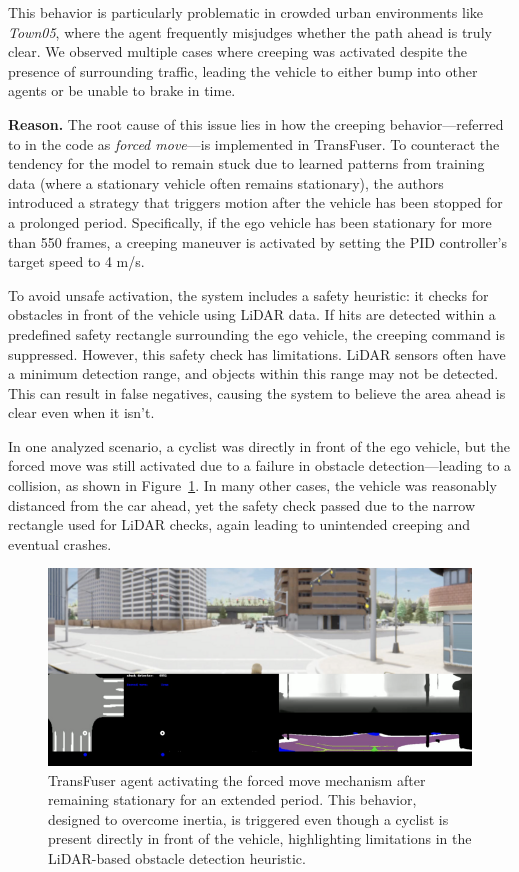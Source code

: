 This behavior is particularly problematic in crowded urban environments like \textit{Town05}, where the agent frequently misjudges whether the path ahead is truly clear. We observed multiple cases where creeping was activated despite the presence of surrounding traffic, leading the vehicle to either bump into other agents or be unable to brake in time.

\noindent\textbf{Reason.} The root cause of this issue lies in how the creeping behavior—referred to in the code as \textit{forced move}—is implemented in TransFuser. To counteract the tendency for the model to remain stuck due to learned patterns from training data (where a stationary vehicle often remains stationary), the authors introduced a strategy that triggers motion after the vehicle has been stopped for a prolonged period. Specifically, if the ego vehicle has been stationary for more than 550 frames, a creeping maneuver is activated by setting the PID controller's target speed to 4 m/s.

To avoid unsafe activation, the system includes a safety heuristic: it checks for obstacles in front of the vehicle using LiDAR data. If hits are detected within a predefined safety rectangle surrounding the ego vehicle, the creeping command is suppressed. However, this safety check has limitations. LiDAR sensors often have a minimum detection range, and objects within this range may not be detected. This can result in false negatives, causing the system to believe the area ahead is clear even when it isn’t.

In one analyzed scenario, a cyclist was directly in front of the ego vehicle, but the forced move was still activated due to a failure in obstacle detection—leading to a collision, as shown in Figure~\ref{fig:tf_forced}. In many other cases, the vehicle was reasonably distanced from the car ahead, yet the safety check passed due to the narrow rectangle used for LiDAR checks, again leading to unintended creeping and eventual crashes.

\begin{figure}[htbp]
    \centering
    \includegraphics[width=\columnwidth]{images/RS23_forcedTF.png}
    \caption{TransFuser agent activating the forced move mechanism after remaining stationary for an extended period. This behavior, designed to overcome inertia, is triggered even though a cyclist is present directly in front of the vehicle, highlighting limitations in the LiDAR-based obstacle detection heuristic.}
    \label{fig:tf_forced}
\end{figure}

